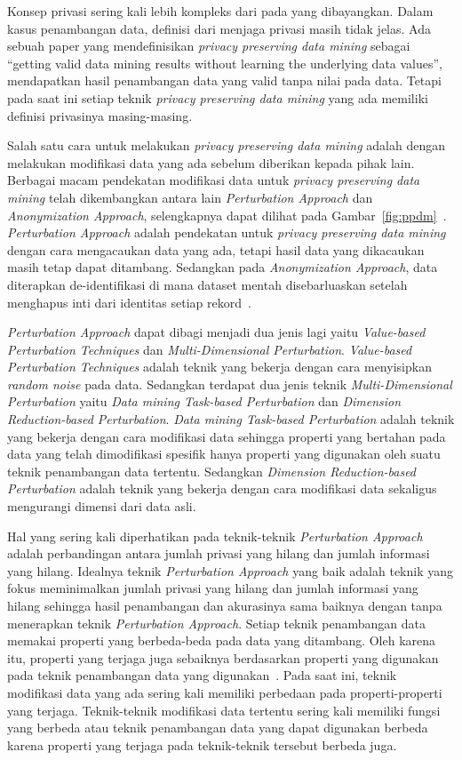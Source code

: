 Konsep privasi sering kali lebih kompleks dari pada yang dibayangkan. Dalam kasus penambangan data, definisi dari menjaga privasi masih tidak jelas. Ada sebuah paper yang mendefinisikan \textit{privacy preserving data mining} sebagai “getting valid data mining results without learning the underlying data values”, mendapatkan hasil penambangan data yang valid tanpa  nilai pada data. Tetapi pada saat ini setiap teknik \textit{privacy preserving data mining} yang ada memiliki definisi privasinya masing-masing. 

Salah satu cara untuk melakukan \textit{privacy preserving data mining} adalah dengan melakukan modifikasi data yang ada sebelum diberikan kepada pihak lain. Berbagai macam pendekatan modifikasi data untuk \textit{privacy preserving data mining} telah dikembangkan antara lain \textit{Perturbation Approach} dan \textit{Anonymization Approach}, selengkapnya dapat dilihat pada Gambar~\ref{fig:ppdm}~\cite{rezaseifi:11:ppdm}. \textit{Perturbation Approach} adalah pendekatan untuk \textit{privacy preserving data mining} dengan cara mengacaukan data yang ada, tetapi hasil data yang dikacaukan masih tetap dapat ditambang. Sedangkan pada \textit{Anonymization Approach}, data diterapkan de-identifikasi di mana dataset mentah disebarluaskan setelah menghapus inti dari identitas setiap rekord~\cite{rezaseifi:11:ppdm}.

\textit{Perturbation Approach} dapat dibagi menjadi dua jenis lagi yaitu \textit{Value-based Perturbation Techniques} dan \textit{Multi-Dimensional Perturbation}. \textit{Value-based Perturbation Techniques} adalah teknik yang bekerja dengan cara menyisipkan \textit{random noise} pada data. Sedangkan terdapat dua jenis teknik \textit{Multi-Dimensional Perturbation} yaitu \textit{Data mining Task-based Perturbation} dan \textit{Dimension Reduction-based Perturbation}. \textit{Data mining Task-based Perturbation} adalah teknik yang bekerja dengan cara modifikasi data sehingga properti yang bertahan pada data yang telah dimodifikasi spesifik hanya properti yang digunakan oleh suatu teknik penambangan data tertentu. Sedangkan \textit{Dimension Reduction-based Perturbation} adalah teknik yang bekerja dengan cara modifikasi data sekaligus mengurangi dimensi dari data asli.

Hal yang sering kali diperhatikan pada teknik-teknik \textit{Perturbation Approach} adalah perbandingan antara jumlah privasi yang hilang dan jumlah informasi yang hilang. Idealnya teknik \textit{Perturbation Approach} yang baik adalah teknik yang fokus meminimalkan jumlah privasi yang hilang dan jumlah informasi yang hilang sehingga hasil penambangan dan akurasinya sama baiknya dengan tanpa menerapkan teknik \textit{Perturbation Approach}. Setiap teknik penambangan data memakai properti yang berbeda-beda pada data yang ditambang. Oleh karena itu, properti yang terjaga juga sebaiknya berdasarkan properti yang digunakan pada teknik penambangan data yang digunakan~\cite{rotation:05:chenliu}. Pada saat ini, teknik modifikasi data yang ada sering kali memiliki perbedaan pada properti-properti yang terjaga. Teknik-teknik modifikasi data tertentu sering kali memiliki fungsi yang berbeda atau teknik penambangan data yang dapat digunakan berbeda karena properti yang terjaga pada teknik-teknik tersebut berbeda juga.

